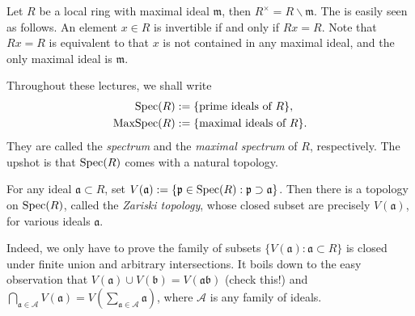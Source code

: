 \begin{remark}
	Let $R$ be a local ring with maximal ideal $\mathfrak{m}$, then $R^\times = R \smallsetminus \mathfrak{m}$. The is easily seen as follows. An element $x \in R$ is invertible if and only if $Rx = R$. Note that $Rx=R$ is equivalent to that $x$ is not contained in any maximal ideal, and the only maximal ideal is $\mathfrak{m}$.
\end{remark}

Throughout these lectures, we shall write  
\begin{align*}
	\operatorname{Spec}(R) & := \{ \text{prime ideals of } R \}, \\
	\operatorname{MaxSpec}(R) & := \{ \text{maximal ideals of } R \}.
\end{align*}
They are called the \emph{spectrum} and the \emph{maximal spectrum} of $R$, respectively. The upshot is that $\operatorname{Spec}(R)$ comes with a natural topology.

\begin{definition} 
	For any ideal $\mathfrak{a} \subset R$, set $V(\mathfrak{a}) := \{ \mathfrak{p} \in \operatorname{Spec}(R): \mathfrak{p} \supset \mathfrak{a} \}$. Then there is a topology on $\operatorname{Spec}(R)$, called the \emph{Zariski topology}, whose closed subset are precisely $V(\mathfrak{a})$, for various ideals $\mathfrak{a}$.
\end{definition}
Indeed, we only have to prove the family of subsets $\{ V(\mathfrak{a}) : \mathfrak{a} \subset R \}$ is closed under finite union and arbitrary intersections. It boils down to the easy observation that $V(\mathfrak{a}) \cup V(\mathfrak{b}) = V(\mathfrak{a}\mathfrak{b})$ (check this!) and $\bigcap_{\mathfrak{a} \in \mathcal{A}} V(\mathfrak{a}) = V\left( \sum_{\mathfrak{a} \in \mathcal{A}} \mathfrak{a} \right)$, where $\mathcal{A}$ is any family of ideals.

